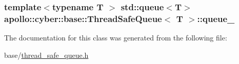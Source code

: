 \hypertarget{classapollo_1_1cyber_1_1base_1_1ThreadSafeQueue_a8e0f3ac13d5adcdc05c4973594fbee27}{
\subsubsection[{queue\-\_\-}]{\setlength{\rightskip}{0pt plus 5cm}template$<$typename T $>$ std\-::queue$<$T$>$ {\bf apollo\-::cyber\-::base\-::\-Thread\-Safe\-Queue}$<$ T $>$\-::queue\-\_\-\hspace{0.3cm}{\ttfamily [private]}}}\label{classapollo_1_1cyber_1_1base_1_1ThreadSafeQueue_a8e0f3ac13d5adcdc05c4973594fbee27}


The documentation for this class was generated from the following file\-:\begin{DoxyCompactItemize}
\item 
base/\hyperlink{thread__safe__queue_8h}{thread\-\_\-safe\-\_\-queue.\-h}\end{DoxyCompactItemize}
